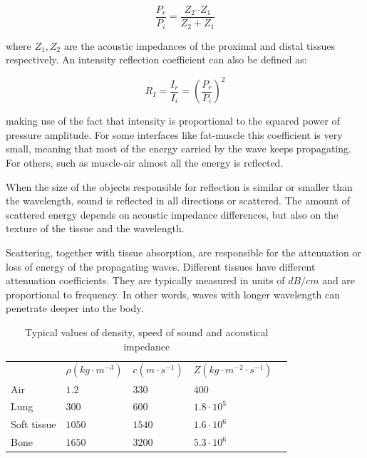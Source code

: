 \documentclass[11pt]{article} %
\begin{document}
	\[ \frac{P_r}{P_i} = \frac{Z_2 – Z_1}{Z_2 + Z_1} \]	
	
	where $Z_1, Z_2$ are the acoustic impedances of the proximal and distal tissues respectively. An intensity reflection coefficient can also be defined as: 	
	
	\[ R_I = \frac{I_r}{I_i} = \left( \frac{P_r}{P_i} \right)^2 \]	
	
	making use of the fact that intensity is proportional to the squared power of pressure amplitude. For some interfaces like fat-muscle this coefficient is very small, meaning that most of the energy carried by the wave keeps propagating. For others, such as muscle-air almost all the energy is reflected.

	
	When the size of the objects responsible for reflection is similar or smaller than the wavelength, sound is reflected in all directions or scattered. The amount of scattered energy depends on acoustic impedance differences, but also on the texture of the tissue and the wavelength.

	
	Scattering, together with tissue absorption, are responsible for the attenuation or loss of energy of the propagating waves. Different tissues have different attenuation coefficients. They are typically measured in units of $dB/cm$ and are proportional to frequency. In other words, waves with longer wavelength can penetrate deeper into the body. \cite{bushberg}

\begin{table}[]
\centering
\begin{tabular}{l|l|l|l|l}
            & $  \rho (kg  \cdot m^{-3})$ & $c (m \cdot s^{-1})$ & $Z (kg \cdot m^{-2} \cdot s^{-1})$ &  \\ \cline{1-4}
Air         & $1.2$                       & $330$                & $400$                              &  \\
Lung        & $300$                       & $600$                & $1.8 \cdot 10^5$                   &  \\
Soft tissue & $1050$                      & $1540$               & $1.6 \cdot 10^6$                   &  \\
Bone        & $1650$                      & $3200$               & $5.3 \cdot 10^6$                   & 
\end{tabular}
\caption{Typical values of density, speed of sound and acoustical impedance \cite{farr}}
\end{table}
\end{document}
